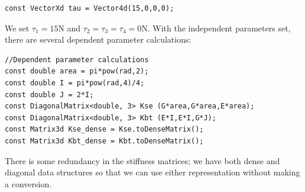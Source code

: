 \documentclass[12pt]{article}
\begin{document}
\begin{lstlisting}
const VectorXd tau = Vector4d(15,0,0,0);
\end{lstlisting}
We set $\tau_1 = 15$N and $\tau_2 = \tau_3 = \tau_4 = 0$N.
With the independent parameters set, there are several dependent parameter calculations:
\begin{lstlisting}
//Dependent parameter calculations
const double area = pi*pow(rad,2);
const double I = pi*pow(rad,4)/4;
const double J = 2*I;
const DiagonalMatrix<double, 3> Kse (G*area,G*area,E*area);
const DiagonalMatrix<double, 3> Kbt (E*I,E*I,G*J);
const Matrix3d Kse_dense = Kse.toDenseMatrix();
const Matrix3d Kbt_dense = Kbt.toDenseMatrix();
\end{lstlisting}
There is some redundancy in the stiffness matrices; we have both dense and diagonal data structures so that we can use either representation without making a conversion.
\end{document}
